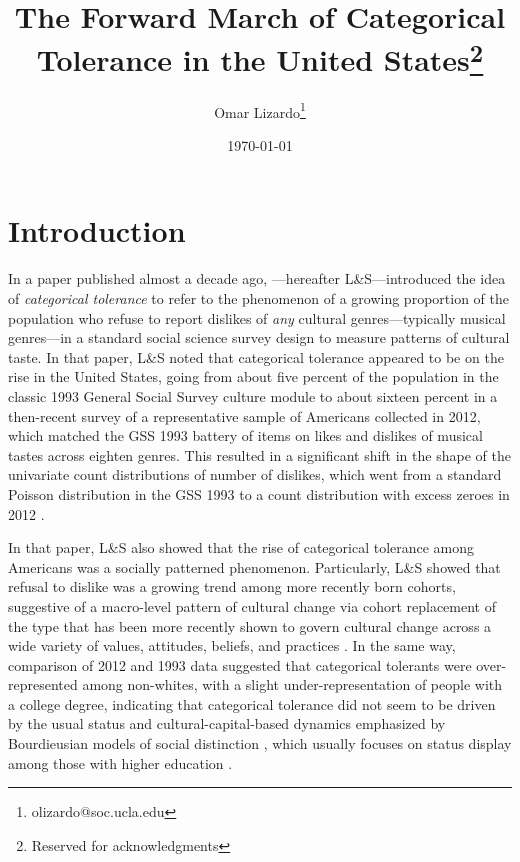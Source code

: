 \documentclass[12pt]{article}
\begin{document}
\title{The Forward March of Categorical Tolerance in the United States\thanks{Reserved for acknowledgments}}
\author[1]{Omar Lizardo\thanks{olizardo@soc.ucla.edu}}

\renewcommand\Authands{ and }

\date{\normalsize \today}	
\maketitle

\newpage
\begin{abstract}
\end{abstract}
\newpage
\section*{Introduction}
In a paper published almost a decade ago, \citet{lizardo2016end-4fb}---hereafter L\&S---introduced the idea of \textit{categorical tolerance} to refer to the phenomenon of a growing proportion of the population who refuse to report dislikes of \textit{any} cultural genres---typically musical genres---in a standard social science survey design to measure patterns of cultural taste. In that paper, L\&S noted that categorical tolerance appeared to be on the rise in the United States, going from about five percent of the population in the classic 1993 General Social Survey culture module to about sixteen percent in a then-recent survey of a representative sample of Americans collected in 2012, which matched the GSS 1993 battery of items on likes and dislikes of musical tastes across eighten genres. This resulted in a significant shift in the shape of the univariate count distributions of number of dislikes, which went from a standard Poisson distribution in the GSS 1993 to a count distribution with excess zeroes in 2012 \citep[p.90, Figure 1]{lizardo2016end-4fb}. 

In that paper, L\&S also showed that the rise of categorical tolerance among Americans was a socially patterned phenomenon. Particularly, L\&S showed that refusal to dislike was a growing trend among more recently born cohorts, suggestive of a macro-level pattern of cultural change via cohort replacement of the type that has been more recently shown to govern cultural change across a wide variety of values, attitudes, beliefs, and practices \citep{vaisey2016cultural-867, kiley2020measuring-123, keskintrk2025what-483, vaisey2021model-based-deb}. In the same way, comparison of 2012 and 1993 data suggested that categorical tolerants were over-represented among non-whites, with a slight under-representation of people with a college degree, indicating that categorical tolerance did not seem to be driven by the usual status and cultural-capital-based dynamics emphasized by Bourdieusian models of social distinction \citep{bourdieu1984distinction-835}, which usually focuses on status display among those with higher education \citep{jarness2017im-001}.
\end{document}
